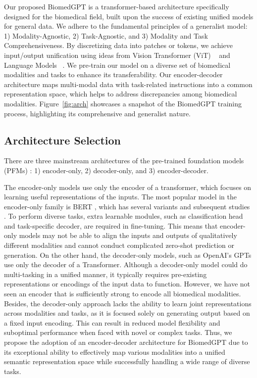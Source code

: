 \documentclass[10pt]{article} \usepackage[preprint]{tmlr}
\begin{document}
Our proposed BiomedGPT is a transformer-based architecture specifically designed for the biomedical field, built upon the success of existing unified models for general data. We adhere to the fundamental principles of a generalist model: 1) Modality-Agnostic, 2) Task-Agnostic, and 3) Modality and Task Comprehensiveness. By discretizing data into patches or tokens, we achieve input/output unification using ideas from Vision Transformer (ViT) ~\citep{dosovitskiy2020image} and Language Models ~\citep{lewis-etal-2020-bart}. We pre-train our model on a diverse set of biomedical modalities and tasks to enhance its transferability. Our encoder-decoder architecture maps multi-modal data with task-related instructions into a common representation space, which helps to address discrepancies among biomedical modalities. Figure~\ref{fig:arch} showcases a snapshot of the BiomedGPT training process, highlighting its comprehensive and generalist nature.

\subsection{Architecture Selection}
There are three mainstream architectures of the pre-trained foundation models (PFMs) \citep{sarrouti2022comparing, fu2023decoder}: 1) encoder-only, 2) decoder-only, and 3) encoder-decoder. 



The encoder-only models use only the encoder of a transformer, which focuses on learning useful representations of the inputs. The most popular model in the encoder-only family is BERT \citep{devlin2018bert}, which has several variants \citep{lan2019albert, sanh2019distilbert, liu2019roberta} and subsequent studies \citep{Clark2020ELECTRA, dosovitskiy2020image}. To perform diverse tasks, extra learnable modules, such as classification head and task-specific decoder, are required in fine-tuning. This means that encoder-only models may not be able to align the inputs and outputs of qualitatively different modalities and cannot conduct complicated zero-shot prediction or generation. On the other hand, the decoder-only models, such as OpenAI's GPTs \citep{radford2018improving, radford2019language, brown2020language} use only the decoder of a Transformer. Although a decoder-only model could do multi-tasking in a unified manner, it typically requires pre-existing representations or encodings of the input data to function. However, we have not seen an encoder that is sufficiently strong to encode all biomedical modalities. Besides, the decoder-only approach lacks the ability to learn joint representations across modalities and tasks, as it is focused solely on generating output based on a fixed input encoding. This can result in reduced model flexibility and suboptimal performance when faced with novel or complex tasks. Thus, we propose the adoption of an encoder-decoder architecture for BiomedGPT due to its exceptional ability to effectively map various modalities into a unified semantic representation space while successfully handling a wide range of diverse tasks.
\end{document}
